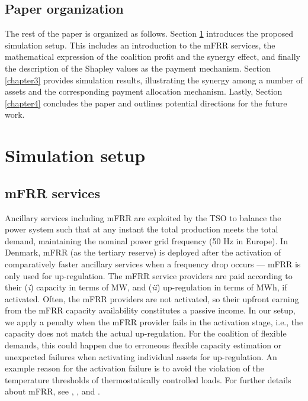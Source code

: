 \documentclass[conference]{IEEEtran}
\begin{document}
\vspace{0mm}
\subsection{Paper organization}
\vspace{-1mm}
The rest of the paper is organized as follows.
Section \ref{chapter2} introduces the proposed simulation setup. This includes an introduction to the mFRR services, the mathematical expression of the coalition profit and the synergy effect, and finally the description of the Shapley values as the payment mechanism. Section \ref{chapter3} provides simulation results, illustrating the synergy among a number of assets and the corresponding payment allocation mechanism. Lastly, Section \ref{chapter4} concludes the paper and outlines potential directions for the future work.

\section{Simulation setup}
\label{chapter2}

\subsection{mFRR services}\label{sec:mFRR}
%
Ancillary services including mFRR are exploited by the TSO to balance the power system such that at any instant the total production meets the total demand, maintaining the nominal power grid frequency (50 Hz in Europe). In Denmark, mFRR (as the tertiary reserve) is deployed after the activation of comparatively faster ancillary services when a frequency drop occurs --- mFRR is only used for up-regulation. The mFRR service providers are paid according to their (\textit{i}) capacity in terms of MW, and (\textit{ii}) up-regulation in terms of MWh, if activated. Often, the mFRR providers are not activated, so their upfront earning from the mFRR capacity availability constitutes a passive income. In our setup, we apply a penalty when the mFRR provider fails in the activation stage, i.e., the capacity does not match the actual up-regulation. For the coalition of flexible demands, this could happen due to erroneous flexible capacity estimation or unexpected failures when activating individual assets for up-regulation. An example reason for the activation failure is to avoid the violation of the temperature thresholds of thermostatically controlled loads. %
For further details about mFRR, see \cite{energinet:prequalification}, \cite{energinet:Systemydelser}, and \cite{energinet:tender_conditions_reserves}.
\end{document}
